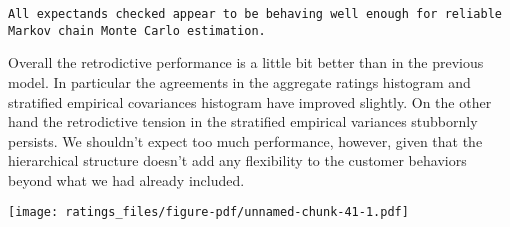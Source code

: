 \documentclass[
  letterpaper,
  DIV=11,
  numbers=noendperiod]{scrartcl}
\newenvironment{Shaded}{\begin{snugshade}}{\end{snugshade}}
\newcommand{\AttributeTok}[1]{\textcolor[rgb]{0.40,0.45,0.13}{#1}}
\newcommand{\DecValTok}[1]{\textcolor[rgb]{0.68,0.00,0.00}{#1}}
\newcommand{\FloatTok}[1]{\textcolor[rgb]{0.68,0.00,0.00}{#1}}
\newcommand{\FunctionTok}[1]{\textcolor[rgb]{0.28,0.35,0.67}{#1}}
\newcommand{\NormalTok}[1]{\textcolor[rgb]{0.00,0.23,0.31}{#1}}
\newcommand{\SpecialCharTok}[1]{\textcolor[rgb]{0.37,0.37,0.37}{#1}}
\newcommand{\StringTok}[1]{\textcolor[rgb]{0.13,0.47,0.30}{#1}}
\begin{document}
\begin{verbatim}
All expectands checked appear to be behaving well enough for reliable
Markov chain Monte Carlo estimation.
\end{verbatim}

Overall the retrodictive performance is a little bit better than in the
previous model. In particular the agreements in the aggregate ratings
histogram and stratified empirical covariances histogram have improved
slightly. On the other hand the retrodictive tension in the stratified
empirical variances stubbornly persists. We shouldn't expect too much
performance, however, given that the hierarchical structure doesn't add
any flexibility to the customer behaviors beyond what we had already
included.

\begin{Shaded}
\end{Shaded}

\texttt{[image: ratings\_files/figure-pdf/unnamed-chunk-41-1.pdf]}
\end{document}
